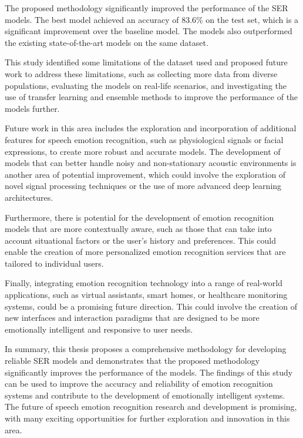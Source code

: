 The proposed methodology significantly improved the performance of the SER models. The best model achieved an accuracy of 83.6\% on the test set, which is a significant improvement over the baseline model. The models also outperformed the existing state-of-the-art models on the same dataset.

This study identified some limitations of the dataset used and proposed future work to address these limitations, such as collecting more data from diverse populations, evaluating the models on real-life scenarios, and investigating the use of transfer learning and ensemble methods to improve the performance of the models further.

Future work in this area includes the exploration and incorporation of additional features for speech emotion recognition, such as physiological signals or facial expressions, to create more robust and accurate models. The development of models that can better handle noisy and non-stationary acoustic environments is another area of potential improvement, which could involve the exploration of novel signal processing techniques or the use of more advanced deep learning architectures.

Furthermore, there is potential for the development of emotion recognition models that are more contextually aware, such as those that can take into account situational factors or the user's history and preferences. This could enable the creation of more personalized emotion recognition services that are tailored to individual users.

Finally, integrating emotion recognition technology into a range of real-world applications, such as virtual assistants, smart homes, or healthcare monitoring systems, could be a promising future direction. This could involve the creation of new interfaces and interaction paradigms that are designed to be more emotionally intelligent and responsive to user needs.

In summary, this thesis proposes a comprehensive methodology for developing reliable SER models and demonstrates that the proposed methodology significantly improves the performance of the models. The findings of this study can be used to improve the accuracy and reliability of emotion recognition systems and contribute to the development of emotionally intelligent systems. The future of speech emotion recognition research and development is promising, with many exciting opportunities for further exploration and innovation in this area.
